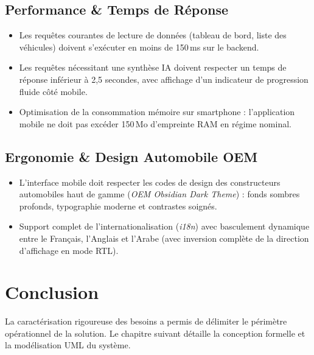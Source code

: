 \documentclass[12pt,a4paper,twoside,openright]{report}
\newcommand{\itembullet}{\textcolor{secondaryBlue}{$\blacktriangleright$}}
\begin{document}
  \subsection{Performance \& Temps de R\'eponse}
  \begin{itemize}[label=\itembullet]
    \item Les requ\^etes courantes de lecture de donn\'ees (tableau de bord, liste des v\'ehicules) doivent s'ex\'ecuter en moins de 150\,ms sur le backend.
    \item Les requ\^etes n\'ecessitant une synth\`ese IA doivent respecter un temps de r\'eponse inf\'erieur \`a 2,5 secondes, avec affichage d'un indicateur de progression fluide c\^ot\'e mobile.
    \item Optimisation de la consommation m\'emoire sur smartphone : l'application mobile ne doit pas exc\'eder 150\,Mo d'empreinte RAM en r\'egime nominal.
  \end{itemize}

  \subsection{Ergonomie \& Design Automobile OEM}
  \begin{itemize}[label=\itembullet]
    \item L'interface mobile doit respecter les codes de design des constructeurs automobiles haut de gamme (\textit{OEM Obsidian Dark Theme}) : fonds sombres profonds, typographie moderne et contrastes soign\'es.
    \item Support complet de l'internationalisation (\textit{i18n}) avec basculement dynamique entre le Fran\c{c}ais, l'Anglais et l'Arabe (avec inversion compl\`ete de la direction d'affichage en mode RTL).
  \end{itemize}

  \section{Conclusion}
  La caract\'erisation rigoureuse des besoins a permis de d\'elimiter le p\'erim\`etre op\'erationnel de la solution. Le chapitre suivant d\'etaille la conception formelle et la mod\'elisation UML du syst\`eme.

  \newpage

\end{document}
